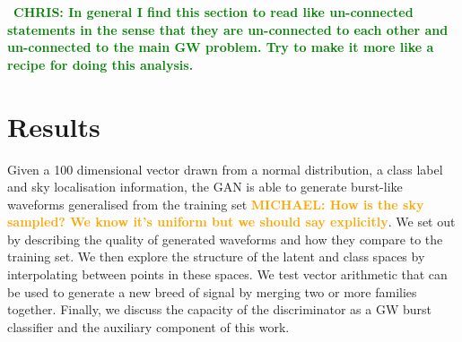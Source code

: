 \documentclass[12pt]{iopart}
\newcommand{\chris}[1]{\textbf{\textcolor{green}{CHRIS: #1}}}
\newcommand{\michael}[1]{\textbf{\textcolor{orange}{MICHAEL: #1}}}
\begin{document}

~\chris{In general I find this section to read like un-connected statements in
the sense that they are un-connected to each other and un-connected to the main
GW problem. Try to make it more like a recipe for doing this analysis.}

\section{Results}

Given a 100 dimensional vector drawn from a normal distribution, a class label and sky localisation information, the GAN is able to generate burst-like waveforms  generalised from the training set \michael{How is the sky sampled? We know it's uniform but we should say explicitly}. We set out by describing the quality of generated waveforms and how they compare to the training set. We then explore the structure of the latent and class spaces by interpolating between points in these spaces. We test vector arithmetic that can be used to generate a new breed of signal by merging two or more families together. Finally, we discuss the capacity of the discriminator as a \ac{GW} burst classifier and the auxiliary component of this work. 
\end{document}
